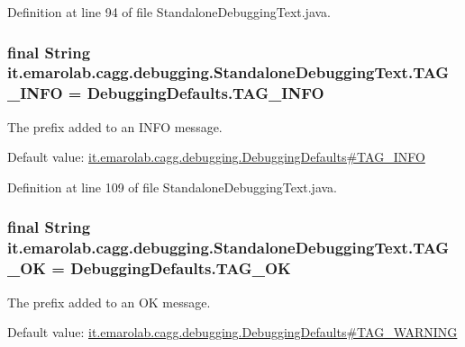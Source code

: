 Definition at line 94 of file Standalone\-Debugging\-Text.\-java.

\hypertarget{classit_1_1emarolab_1_1cagg_1_1debugging_1_1StandaloneDebuggingText_a09a44bdbeff02bfca0dca16f72a7f520}{
\subsubsection[{T\-A\-G\-\_\-\-I\-N\-F\-O}]{\setlength{\rightskip}{0pt plus 5cm}final String it.\-emarolab.\-cagg.\-debugging.\-Standalone\-Debugging\-Text.\-T\-A\-G\-\_\-\-I\-N\-F\-O = Debugging\-Defaults.\-T\-A\-G\-\_\-\-I\-N\-F\-O\hspace{0.3cm}{\ttfamily [static]}}}\label{classit_1_1emarolab_1_1cagg_1_1debugging_1_1StandaloneDebuggingText_a09a44bdbeff02bfca0dca16f72a7f520}
The prefix added to an I\-N\-F\-O message.\par
 Default value\-: \hyperlink{classit_1_1emarolab_1_1cagg_1_1debugging_1_1DebuggingDefaults_a0479528bb8c46a8159792c7f656ad135}{it.\-emarolab.\-cagg.\-debugging.\-Debugging\-Defaults\#\-T\-A\-G\-\_\-\-I\-N\-F\-O} 

Definition at line 109 of file Standalone\-Debugging\-Text.\-java.

\hypertarget{classit_1_1emarolab_1_1cagg_1_1debugging_1_1StandaloneDebuggingText_a8a3a3ed3e65988710e063e64509fa678}{
\subsubsection[{T\-A\-G\-\_\-\-O\-K}]{\setlength{\rightskip}{0pt plus 5cm}final String it.\-emarolab.\-cagg.\-debugging.\-Standalone\-Debugging\-Text.\-T\-A\-G\-\_\-\-O\-K = Debugging\-Defaults.\-T\-A\-G\-\_\-\-O\-K\hspace{0.3cm}{\ttfamily [static]}}}\label{classit_1_1emarolab_1_1cagg_1_1debugging_1_1StandaloneDebuggingText_a8a3a3ed3e65988710e063e64509fa678}
The prefix added to an O\-K message.\par
 Default value\-: \hyperlink{classit_1_1emarolab_1_1cagg_1_1debugging_1_1DebuggingDefaults_a404289c07e43a1d8bbbb5386a8350fea}{it.\-emarolab.\-cagg.\-debugging.\-Debugging\-Defaults\#\-T\-A\-G\-\_\-\-W\-A\-R\-N\-I\-N\-G} 

